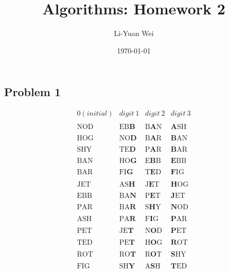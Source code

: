 \documentclass[a4paper]{article}
\makeatletter
\newenvironment{solution}
  {\begin{proof}[Solution]}
  {\end{proof}}
\renewenvironment{proof}[1][\proofname]{%
  \par\pushQED{\qed}\normalfont%
  \topsep6\p@\@plus6\p@\relax
  \trivlist\item[\hskip\labelsep\bfseries#1\@addpunct{.}]%
  \ignorespaces
}{%
  \popQED\endtrivlist\@endpefalse
}
\makeatother
\begin{document}
\title{Algorithms: Homework 2}
\author{Li-Yuan Wei}
\date{\today}
\maketitle

\subsection*{Problem 1}
\begin{solution}
$$
\begin{array}{cccc}
0(initial)& digit\ 1 & digit\ 2 & digit\ 3 \\\\
\hline
\text{NOD} & \text{EB$\textbf{B}$} & \text{B$\textbf{A}$N} & \text{$\textbf{A}$SH} \\\\
\text{HOG} & \text{NO$\textbf{D}$} & \text{B$\textbf{A}$R} & \text{$\textbf{B}$AN} \\\\
\text{SHY} & \text{TE$\textbf{D}$} & \text{P$\textbf{A}$R} & \text{$\textbf{B}$AR} \\\\
\text{BAN} & \text{HO$\textbf{G}$} & \text{E$\textbf{B}$B} & \text{$\textbf{E}$BB} \\\\
\text{BAR} & \text{FI$\textbf{G}$} & \text{T$\textbf{E}$D} & \text{$\textbf{F}$IG} \\\\
\text{JET} & \text{AS$\textbf{H}$} & \text{J$\textbf{E}$T} & \text{$\textbf{H}$OG} \\\\
\text{EBB} & \text{BA$\textbf{N}$} & \text{P$\textbf{E}$T} & \text{$\textbf{J}$ET} \\\\
\text{PAR} & \text{BA$\textbf{R}$} & \text{S$\textbf{H}$Y} & \text{$\textbf{N}$OD} \\\\
\text{ASH} & \text{PA$\textbf{R}$} & \text{F$\textbf{I}$G} & \text{$\textbf{P}$AR} \\\\
\text{PET} & \text{JE$\textbf{T}$} & \text{N$\textbf{O}$D} & \text{$\textbf{P}$ET} \\\\
\text{TED} & \text{PE$\textbf{T}$} & \text{H$\textbf{O}$G} & \text{$\textbf{R}$OT} \\\\
\text{ROT} & \text{RO$\textbf{T}$} & \text{R$\textbf{O}$T} & \text{$\textbf{S}$HY} \\\\
\text{FIG} & \text{SH$\textbf{Y}$} & \text{A$\textbf{S}$H} & \text{$\textbf{T}$ED} \\\\
\end{array}
$$
\end{solution}
\end{document}
